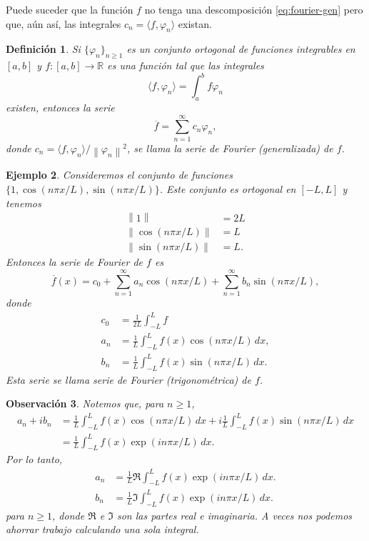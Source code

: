 \documentclass[11pt,letterpaper]{report}
\newtheorem{defn}{Definición}[chapter]
\newtheorem{example}[defn]{Ejemplo}
\newtheorem{obs}[defn]{Observación}
\newcommand\R{\mathbb R}
\newcommand\norm[1]{\left\|#1\right\|}
\newcommand\<{\langle}
\renewcommand\>{\rangle}
\renewcommand\phi\varphi
\begin{document}
Puede suceder que la función $f$ no tenga una descomposición
\eqref{eq:fourier-gen} pero que, aún así,
las integrales $c_n=\<f,\phi_n\>$ existan.

\begin{defn}
  Si $\{\phi_n\}_{n\geq 1}$ es un conjunto ortogonal de funciones
  integrables en $[a,b]$ y $f:[a,b]\to\R$ es una función
  tal que las integrales
  \[
   \<f,\phi_n\> = \int_{a}^{b}f\phi_n
  \]
  existen, entonces la serie
  \[
    \overline{f}=\sum_{n=1}^{\infty}c_n\phi_n
  ,\]
  donde $c_n = \<f,\phi_n\>/\norm{\phi_n}^{2}$, se llama
  la serie de Fourier (generalizada) de $f$.
\end{defn}

\begin{example}
  Consideremos el conjunto de funciones
  $\{1,\cos(n\pi x/L),\sin(n\pi x/L)\}$.
  Este conjunto es ortogonal en $[-L,L]$ y tenemos
  \begin{align*}
    \norm{1} &= 2L \\
    \norm{\cos(n\pi x/L)} &= L \\
    \norm{\sin(n\pi x/L)} &= L.
  \end{align*}
  Entonces la serie de Fourier de $f$ es
  \begin{equation}\label{eq:serie-fourier}
    \overline{f}(x) = c_0
    + \sum_{n=1}^\infty a_n\cos(n\pi x/L)
    + \sum_{n=1}^\infty b_n\sin(n\pi x/L)
  ,
  \end{equation}
  donde
  \begin{align*}
    c_0 &= \frac{1}{2L}\int_{-L}^L f \\
    a_n &= \frac{1}{L}\int_{-L}^L f(x)\cos(n\pi x/L)\,dx, \\
    b_n &= \frac{1}{L}\int_{-L}^L f(x)\sin(n\pi x/L)\,dx.
  \end{align*}
  Esta serie se llama serie de Fourier (trigonométrica) de $f$.
\end{example}

\begin{obs}
Notemos que, para $n\geq 1$,
\begin{align*}
  a_n+ib_n
  &= \frac{1}{L}\int_{-L}^L f(x)\cos(n\pi x/L)\,dx
    + i\frac{1}{L}\int_{-L}^L f(x)\sin(n\pi x/L)\,dx \\
  &= \frac{1}{L}\int_{-L}^L f(x)\exp(in\pi x/L)\,dx.
\end{align*}
Por lo tanto,
\begin{align*}
  a_n &= \frac{1}{L}\Re\int_{-L}^L f(x)\exp(in\pi x/L)\,dx. \\
  b_n &= \frac{1}{L}\Im\int_{-L}^L f(x)\exp(in\pi x/L)\,dx.
\end{align*}
para $n\geq 1$, donde $\Re$ e $\Im$ son las partes real e imaginaria.
A veces nos podemos ahorrar trabajo calculando una sola integral.
\end{obs}
\end{document}
